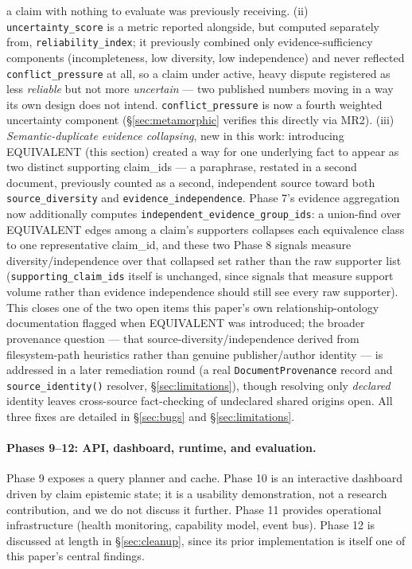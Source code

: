 a claim with nothing to evaluate was previously receiving. (ii)
\texttt{uncertainty\_score} is a metric reported alongside, but computed
separately from, \texttt{reliability\_index}; it previously combined only
evidence-sufficiency components (incompleteness, low diversity, low
independence) and never reflected \texttt{conflict\_pressure} at all, so a
claim under active, heavy dispute registered as less \emph{reliable} but
not more \emph{uncertain} --- two published numbers moving in a way its own
design does not intend. \texttt{conflict\_pressure} is now a fourth
weighted uncertainty component (\S\ref{sec:metamorphic} verifies this
directly via MR2). (iii) \emph{Semantic-duplicate evidence collapsing},
new in this work: introducing EQUIVALENT (this section) created a way for
one underlying fact to appear as two distinct supporting claim\_ids ---
a paraphrase, restated in a second document, previously counted as a
second, independent source toward both \texttt{source\_diversity} and
\texttt{evidence\_independence}. Phase 7's evidence aggregation now
additionally computes \texttt{independent\_evidence\_group\_ids}: a
union-find over EQUIVALENT edges among a claim's supporters collapses
each equivalence class to one representative claim\_id, and these two
Phase 8 signals measure diversity/independence over that collapsed set
rather than the raw supporter list (\texttt{supporting\_claim\_ids}
itself is unchanged, since signals that measure support volume rather
than evidence independence should still see every raw supporter). This
closes one of the two open items this paper's own relationship-ontology
documentation flagged when EQUIVALENT was introduced; the broader
provenance question --- that source-diversity/independence derived from
filesystem-path heuristics rather than genuine publisher/author identity
--- is addressed in a later remediation round (a real
\texttt{DocumentProvenance} record and \texttt{source\_identity()}
resolver, \S\ref{sec:limitations}), though resolving only \emph{declared}
identity leaves cross-source fact-checking of undeclared shared origins
open. All three fixes are
detailed in \S\ref{sec:bugs} and \S\ref{sec:limitations}.

\paragraph{Phases 9--12: API, dashboard, runtime, and evaluation.} Phase 9
exposes a query planner and cache. Phase 10 is an interactive dashboard
driven by claim epistemic state; it is a usability demonstration, not a
research contribution, and we do not discuss it further. Phase 11 provides
operational infrastructure (health monitoring, capability model, event
bus). Phase 12 is discussed at length in \S\ref{sec:cleanup}, since its
prior implementation is itself one of this paper's central findings.

